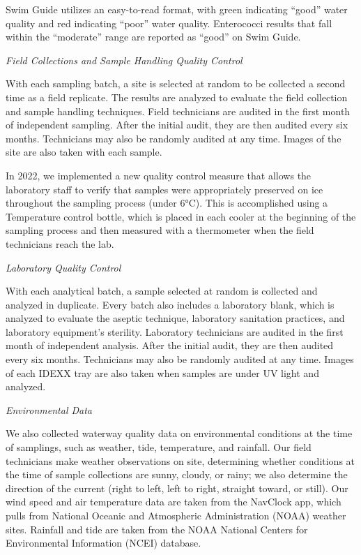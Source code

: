 \documentclass[
]{article}
\begin{document}
Swim Guide utilizes an easy-to-read format, with green indicating
``good'' water quality and red indicating ``poor'' water quality.
Enterococci results that fall within the ``moderate'' range are reported
as ``good'' on Swim Guide.

\emph{Field Collections and Sample Handling Quality Control}

With each sampling batch, a site is selected at random to be collected a
second time as a field replicate. The results are analyzed to evaluate
the field collection and sample handling techniques. Field technicians
are audited in the first month of independent sampling. After the
initial audit, they are then audited every six months. Technicians may
also be randomly audited at any time. Images of the site are also taken
with each sample.

In 2022, we implemented a new quality control measure that allows the
laboratory staff to verify that samples were appropriately preserved on
ice throughout the sampling process (under 6°C). This is accomplished
using a Temperature control bottle, which is placed in each cooler at
the beginning of the sampling process and then measured with a
thermometer when the field technicians reach the lab.

\emph{Laboratory Quality Control}

With each analytical batch, a sample selected at random is collected and
analyzed in duplicate. Every batch also includes a laboratory blank,
which is analyzed to evaluate the aseptic technique, laboratory
sanitation practices, and laboratory equipment's sterility. Laboratory
technicians are audited in the first month of independent analysis.
After the initial audit, they are then audited every six months.
Technicians may also be randomly audited at any time. Images of each
IDEXX tray are also taken when samples are under UV light and analyzed.

\emph{Environmental Data}

We also collected waterway quality data on environmental conditions at
the time of samplings, such as weather, tide, temperature, and rainfall.
Our field technicians make weather observations on site, determining
whether conditions at the time of sample collections are sunny, cloudy,
or rainy; we also determine the direction of the current (right to left,
left to right, straight toward, or still). Our wind speed and air
temperature data are taken from the NavClock app, which pulls from
National Oceanic and Atmospheric Administration (NOAA) weather sites.
Rainfall and tide are taken from the NOAA National Centers for
Environmental Information (NCEI) database.
\end{document}
